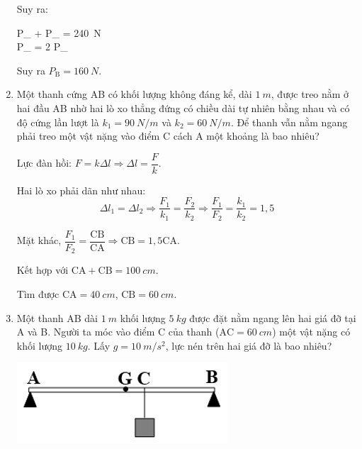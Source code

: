 \begin{enumerate}[label=\bfseries Câu \arabic*:]
{	Suy ra:
			\begin{cases}
		P_ + P_ = \SI{240}{N} \\
		P_ = 2 P_
	\end{cases}

	Suy ra $P_\text{B} = \SI{160}{N}$.
	}
	\item {}
	
	\cauhoi
	{Một thanh cứng AB có khối lượng không đáng kể, dài $\SI{1}{m}$, được treo nằm ở hai đầu AB nhờ hai lò xo thẳng đứng có chiều dài tự nhiên bằng nhau và có độ cứng lần lượt là $k_1=\SI{90}{N/m}$ và $k_2=\SI{60}{N/m}$. Để thanh vẫn nằm ngang phải treo một vật nặng vào điểm C cách A một khoảng là bao nhiêu?
	}
	
	\loigiai
	{Lực đàn hồi: $F=k \Delta l \Rightarrow \Delta l = \dfrac{F}{k}$.
		
	Hai lò xo phải dãn như nhau:
	$$\Delta l_1 = \Delta l_2 \Rightarrow \dfrac{F_1}{k_1} = \dfrac{F_2}{k_2} \Rightarrow \dfrac{F_1}{F_2} = \dfrac{k_1}{k_2} = 1,5$$
	
	Mặt khác, $\dfrac{F_1}{F_2} = \dfrac{\text{CB}}{\text{CA}} \Rightarrow \text{CB} = 1,5 \text{CA}$.
	
	Kết hợp với $\text{CA} + \text{CB} = \SI{100}{cm}$.
	
	Tìm được $\text{CA} = \SI{40}{cm}$, $\text{CB} = \SI{60}{cm}$.
	}
	\item {}
	
	\cauhoi
	{Một thanh AB dài $\SI{1}{m}$ khối lượng $\SI{5}{kg}$ được đặt nằm ngang lên hai giá đỡ tại A và B. Người ta móc vào điểm C của thanh ($\textrm{AC}=\SI{60}{cm}$) một vật nặng có khối lượng $\SI{10}{kg}$. Lấy $g=\SI[parse-numbers=false]{10}{m/s^2}$, lực nén trên hai giá đỡ là bao nhiêu? 
	\begin{center}
		\includegraphics[scale=1]{../figs/VN10-2021-PH-TP022-1.png}
	\end{center}
	}
	

\end{enumerate}
